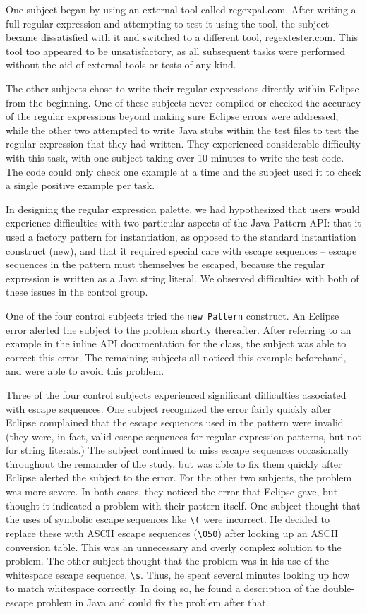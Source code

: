 \documentclass[10pt, conference, compsocconf]{IEEEtran}
\begin{document}
One subject began by using an external tool called regexpal.com. After writing a full regular expression and attempting to test it using the tool, the subject became dissatisfied with it and switched to a different tool, regextester.com. This tool too appeared to be unsatisfactory, as all subsequent tasks were performed without the aid of external tools or tests of any kind.

The other subjects chose to write their regular expressions directly within Eclipse from the beginning. One of these subjects never compiled or checked the accuracy of the regular expressions beyond making sure Eclipse errors were addressed, while the other two attempted to write Java stubs within the test files to test the regular expression that they had written. They experienced considerable difficulty with this task, with one subject taking over 10 minutes to write the test code. The code could only check one example at a time and the subject used it to check a single positive example per task.

In designing the regular expression palette, we had hypothesized that users would experience difficulties with two particular aspects of the Java Pattern API: that it used a factory pattern for instantiation, as opposed to the standard instantiation construct (new), and that it required special care with escape sequences -- escape sequences in the pattern must themselves be escaped, because the regular expression is written as a Java string literal. We observed difficulties with both of these issues in the control group. 

One of the four control subjects tried the \verb|new Pattern| construct. An Eclipse error alerted the subject to the problem shortly thereafter. After referring to an example in the inline API documentation for the class, the subject was able to correct this error. The remaining subjects all noticed this example beforehand, and were able to avoid this problem.

Three of the four control subjects experienced significant difficulties associated with escape sequences. One subject recognized the error fairly quickly after Eclipse complained that the escape sequences used in the pattern were invalid (they were, in fact, valid escape sequences for regular expression patterns, but not for string literals.) The subject continued to miss escape sequences occasionally throughout the remainder of the study, but was able to fix them quickly after Eclipse alerted the subject to the error. For the other two subjects, the problem was more severe. In both cases, they noticed the error that Eclipse gave, but thought it indicated a problem with their pattern itself. One subject thought that the uses of symbolic escape sequences like \verb|\(| were incorrect. He decided to replace these with ASCII escape sequences (\verb|\050|) after looking up an ASCII conversion table. This was an unnecessary and overly complex solution to the problem. The other subject thought that the problem was in his use of the whitespace escape sequence, \verb|\s|. Thus, he  spent several minutes looking up how to match whitespace correctly. In doing so, he found a description of the double-escape problem in Java and could fix the problem after that.
\end{document}

